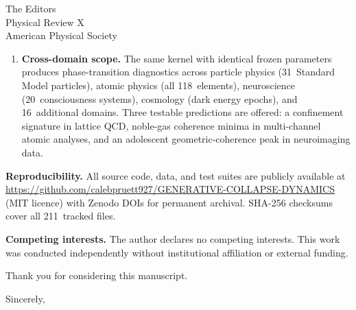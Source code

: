\documentclass[11pt]{letter}
\begin{document}
\begin{letter}{The Editors\\Physical Review X\\American Physical Society}
\begin{enumerate}
\item \textbf{Cross-domain scope.} The same kernel with identical
  frozen parameters produces phase-transition diagnostics across
  particle physics (31~Standard Model particles), atomic physics
  (all 118~elements), neuroscience (20~consciousness systems),
  cosmology (dark energy epochs), and 16~additional domains. Three
  testable predictions are offered: a confinement signature in
  lattice QCD, noble-gas coherence minima in multi-channel atomic
  analyses, and an adolescent geometric-coherence peak in
  neuroimaging data.
\end{enumerate}

\textbf{Reproducibility.} All source code, data, and test suites
are publicly available at
\url{https://github.com/calebpruett927/GENERATIVE-COLLAPSE-DYNAMICS}
(MIT licence) with Zenodo DOIs for permanent archival. SHA-256
checksums cover all 211~tracked files.

\textbf{Competing interests.} The author declares no competing
interests. This work was conducted independently without
institutional affiliation or external funding.

Thank you for considering this manuscript.

\closing{Sincerely,}

\end{letter}
\end{document}

